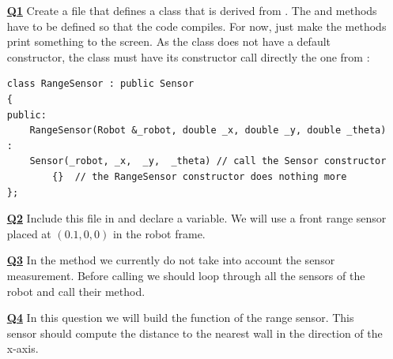 \documentclass{ecnreport}
\begin{document}
\begin{itemize}
\medskip\item[\textbf{\underline{Q1}}] Create a  file that defines a  class that is derived from . The  and  methods have to be defined so that the code compiles. For now, just make the methods print something to the screen.
As the  class does not have a default constructor, the  class must have its constructor call directly the one from  :
\begin{center}\cppstyle
\begin{lstlisting}
class RangeSensor : public Sensor
{
public:
    RangeSensor(Robot &_robot, double _x, double _y, double _theta) :
	Sensor(_robot, _x,  _y,  _theta) // call the Sensor constructor
        {}	// the RangeSensor constructor does nothing more
};    
\end{lstlisting}
\end{center}

\medskip\item[\textbf{\underline{Q2}}] Include this file in  and declare a  variable.  We will use a front range sensor placed at $(0.1, 0,0)$ in the robot frame.

\medskip\item[\textbf{\underline{Q3}}] In the  method we currently do not take into account the sensor measurement. 
Before calling  we should loop through all the sensors of the robot and call their  method.

\medskip\item[\textbf{\underline{Q4}}] In this question we will build the  function of the range sensor.
This sensor should compute the distance to the nearest wall in the direction of the x-axis.\\


\end{itemize}
\end{document}
